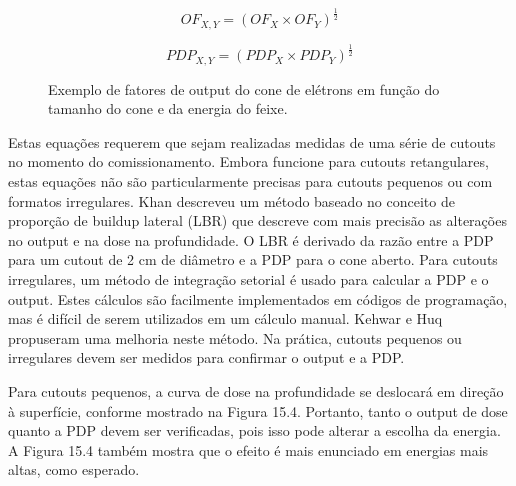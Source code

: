 \documentclass[11pt,a4paper]{article}
\begin{document}
	\begin{equation}
		OF_{X,Y} = \left(OF_X \times OF_Y\right)^{\frac{1}{2}}
	\end{equation}

	\begin{equation}
		PDP_{X,Y} = \left(PDP_X \times PDP_Y\right)^{\frac{1}{2}}
	\end{equation}

	\begin{figure}
		\centering
		\caption{Exemplo de fatores de output do cone de elétrons em função do tamanho do cone e da energia do feixe.}
		\label{fig:fatorcone}
	\end{figure}

	Estas equações requerem que sejam realizadas medidas de uma série de cutouts no momento do comissionamento. Embora funcione para cutouts retangulares, estas equações não são particularmente precisas para cutouts pequenos ou com formatos irregulares. Khan descreveu um método baseado no conceito de proporção de buildup lateral (LBR) que descreve com mais precisão as alterações no output e na dose na profundidade. O LBR é derivado da razão entre a PDP para um cutout de 2 cm de diâmetro e a PDP para o cone aberto. Para cutouts irregulares, um método de integração setorial é usado para calcular a PDP e o output. Estes cálculos são facilmente implementados em códigos de programação, mas é difícil de serem utilizados em um cálculo manual. Kehwar e Huq propuseram uma melhoria neste método. Na prática, cutouts pequenos ou irregulares devem ser medidos para confirmar o output e a PDP.

	Para cutouts pequenos, a curva de dose na profundidade se deslocará em direção à superfície, conforme mostrado na Figura 15.4. Portanto, tanto o output de dose quanto a PDP devem ser verificadas, pois isso pode alterar a escolha da energia. A Figura 15.4 também mostra que o efeito é mais enunciado em energias mais altas, como esperado.
\end{document}
